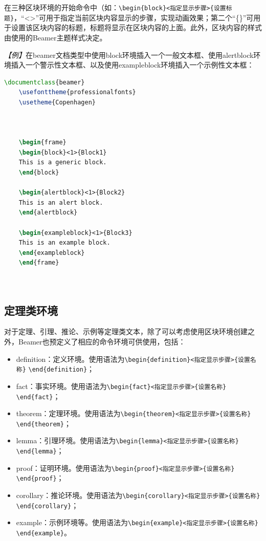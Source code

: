 在三种区块环境的开始命令中（如：\texttt{\textbackslash{}begin\{block\}<指定显示步骤>\{设置标题\}}，“<>”可用于指定当前区块内容显示的步骤，实现动画效果；第二个“\{\}”可用于设置该区块内容的标题，标题将显示在区块内容的上面。此外，区块内容的样式由使用的Beamer主题样式决定。

\emph{【例】}在beamer文档类型中使用block环境插入一个一般文本框、使用alertblock环境插入一个警示性文本框、以及使用exampleblock环境插入一个示例性文本框：
\begin{lstlisting}[language=TeX]
    \documentclass{beamer}
    \usefonttheme{professionalfonts}
    \usetheme{Copenhagen}

    

    \begin{frame}
    \begin{block}<1>{Block1}
    This is a generic block.
    \end{block}

    \begin{alertblock}<1>{Block2}
    This is an alert block.
    \end{alertblock}

    \begin{exampleblock}<1>{Block3}
    This is an example block.
    \end{exampleblock}
    \end{frame}

    
\end{lstlisting}

\subsection{定理类环境}

对于定理、引理、推论、示例等定理类文本，除了可以考虑使用区块环境创建之外，Beamer也预定义了相应的命令环境可供使用，包括：
\begin{itemize}
    \item definition：定义环境。使用语法为\texttt{\textbackslash{}begin\{definition\}<指定显示步骤>\{设置名称\}} \texttt{\textbackslash{}end\{definition\}}；
    \item fact：事实环境。使用语法为\texttt{\textbackslash{}begin\{fact\}<指定显示步骤>\{设置名称\}} \texttt{\textbackslash{}end\{fact\}}；
    \item theorem：定理环境。使用语法为\texttt{\textbackslash{}begin\{theorem\}<指定显示步骤>\{设置名称\}} \texttt{\textbackslash{}end\{theorem\}}；
    \item lemma：引理环境。使用语法为\texttt{\textbackslash{}begin\{lemma\}<指定显示步骤>\{设置名称\}} \texttt{\textbackslash{}end\{lemma\}}；
    \item proof：证明环境。使用语法为\texttt{\textbackslash{}begin\{proof\}<指定显示步骤>\{设置名称\}} \texttt{\textbackslash{}end\{proof\}}；
    \item corollary：推论环境。使用语法为\texttt{\textbackslash{}begin\{corollary\}<指定显示步骤>\{设置名称\}} \texttt{\textbackslash{}end\{corollary\}}；
    \item example：示例环境等。使用语法为\texttt{\textbackslash{}begin\{example\}<指定显示步骤>\{设置名称\}} \texttt{\textbackslash{}end\{example\}}。
\end{itemize}


